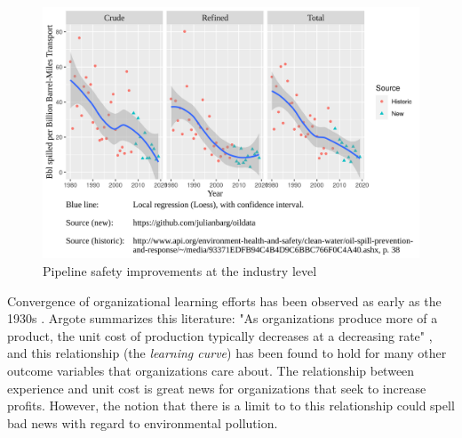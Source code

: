 \begin{figure}
	\caption{Pipeline safety improvements at the industry level}
	\centerline{\includegraphics{../illustrations/population_learning_4.png}}
\end{figure}

Convergence of organizational learning efforts has been observed as early as the 1930s \citep{Wright1936}. Argote summarizes this literature: "As organizations produce more of a product, the unit cost of production typically decreases at a decreasing rate" \citep[p. 1]{Argote2013-1}, and this relationship (the \textit{learning curve}) has been found to hold for many other outcome variables that organizations care about. The relationship between experience and unit cost is great news for organizations that seek to increase profits. However, the notion that there is a limit to to this relationship could spell bad news  with regard to environmental pollution.

